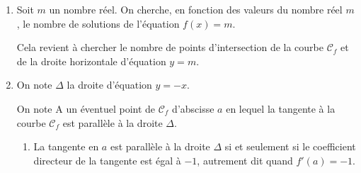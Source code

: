 \begin{enumerate}
$f(1)=\dfrac{\e^{1}}{1}=\e$

On établit le tableau de variations de la fonction $f$:

\begin{center}
{\renewcommand{\arraystretch}{1.3}
\def\esp{\hspace*{1.5cm}}
\def\hauteur{0pt}
$\begin{array}{|c| l *3{c} c|}
\hline
 x & 0 & \esp & 1 & \esp & +\infty \\
\hline
f'(x) &  \vline\;\vline\;  &  \pmb{-} & \vline\hspace{-2.7pt}0 & \pmb{+} & \\  
\hline
  & \vline\;\vline\;  \Rnode{max1}{+\infty}  &  &  &  & \Rnode{max2}{+\infty}   \\
f(x) & \vline\;\vline\;  &  & & &  \rule{0pt}{\hauteur} \\
 &  \vline\;\vline\;  & &   \Rnode{min}{\e} & & \rule{0pt}{\hauteur}
\ncline{->}{max1}{min} \ncline{->}{min}{max2}\\
\hline
\end{array}$
}
\end{center}		
 
\item Soit $m$ un nombre réel. On cherche, en fonction des valeurs du nombre réel $m$, le nombre de solutions de l'équation $f(x) = m$.

Cela revient à chercher le nombre de points d'intersection de la courbe $\mathcal{C}_f$ et de la droite horizontale d'équation $y=m$.


\item  On note $\Delta$ la droite d'équation $y = -x$.

On note A un éventuel point de $\mathcal{C}_f$ d'abscisse $a$ en lequel la tangente à la courbe $\mathcal{C}_f$ est parallèle à la droite $\Delta$.
	\begin{enumerate}
		\item 
La tangente en $a$ est parallèle à la droite $\Delta$ si et seulement si le coefficient directeur de la tangente est égal à $-1$, autrement dit quand $f'(a)=-1$.


\end{enumerate}
\end{enumerate}
